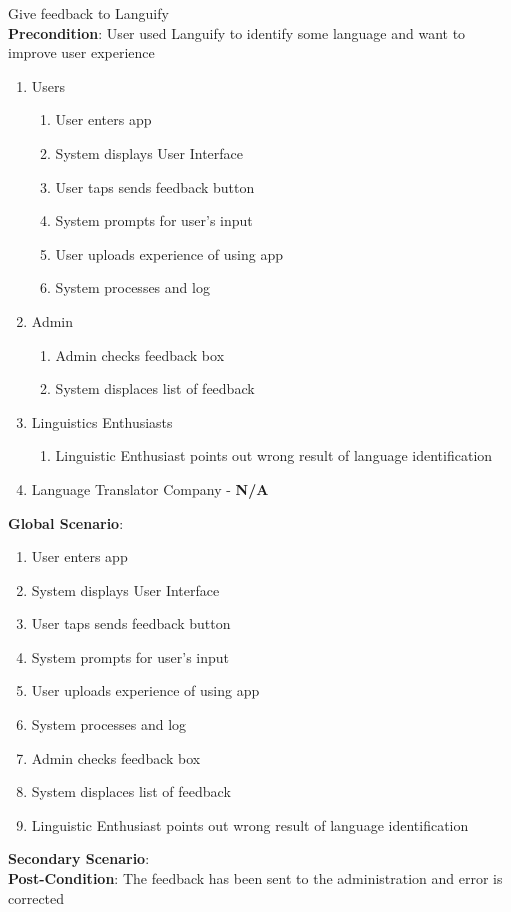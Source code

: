 \item Give feedback to Languify
	\\ \textbf{Precondition}: User used Languify to identify some language and want to improve user experience
	\begin{enumerate}[{\bf VP1.}]
		\item Users
			\begin{enumerate}[{\bf 1.}]
				\item User enters app
				\item System displays User Interface
				\item User taps sends feedback button
				\item System prompts for user’s input
				\item User uploads experience of using app
				\item System processes and log
			\end{enumerate}
		\item Admin
			\begin{enumerate}[{\bf 1.}]
				\item Admin checks feedback box
				\item System displaces list of feedback
			\end{enumerate}
		\item Linguistics Enthusiasts
		\begin{enumerate}[{\bf 1.}]
			\item Linguistic Enthusiast points out wrong result of language identification
		\end{enumerate}
		\item Language Translator Company - \textbf{N/A}
	\end{enumerate}
	\textbf{Global Scenario}:
	\begin{enumerate}[{\bf 1.}]
		\item User enters app
		\item System displays User Interface
		\item User taps sends feedback button
		\item System prompts for user’s input
		\item User uploads experience of using app
		\item System processes and log
		\item Admin checks feedback box
		\item System displaces list of feedback
		\item Linguistic Enthusiast points out wrong result of language identification
	\end{enumerate}
	\textbf{Secondary Scenario}:
	\\ \textbf{Post-Condition}: The feedback has been sent to the administration and error is corrected